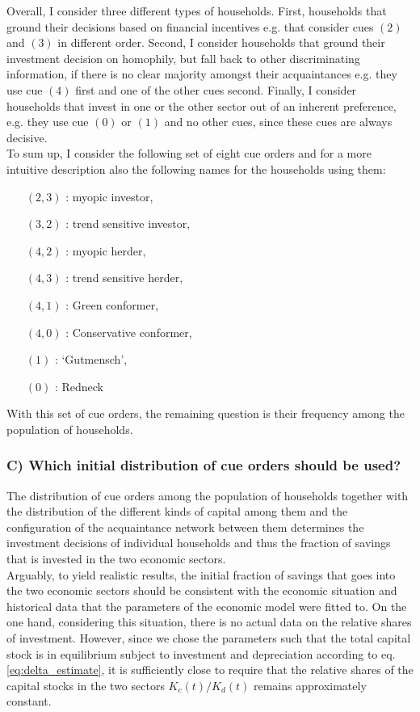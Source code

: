 Overall, I consider three different types of households. First, households that ground their decisions based on financial incentives e.g. that consider cues $(2)$ and $(3)$ in different order. Second, I consider households that ground their investment decision on homophily, but fall back to other discriminating information, if there is no clear majority amongst their acquaintances e.g. they use cue $(4)$ first and one of the other cues second. Finally, I consider households that invest in one or the other sector out of an inherent preference, e.g. they use cue $(0)$ or $(1)$ and no other cues, since these cues are always decisive. \\

To sum up, I consider the following set of eight cue orders and for a more intuitive description also the following names for the households using them:
\begin{itemize}
  \item [$(2, 3)$]: myopic investor,
	\item [$(3, 2)$]: trend sensitive investor,
	\item [$(4, 2)$]: myopic herder,
	\item [$(4, 3)$]: trend sensitive herder,
	\item [$(4, 1)$]: Green conformer,
	\item [$(4, 0)$]: Conservative conformer,
	\item [$(1)$]: `Gutmensch',
	\item [$(0)$]: Redneck
\end{itemize}
With this set of cue orders, the remaining question is their frequency among the population of households.

\subsubsection*{C) Which initial distribution of cue orders should be used?}

The distribution of cue orders among the population of households together with the distribution of the different kinds of capital among them and the configuration of the acquaintance network between them determines the investment decisions of individual households and thus the fraction of savings that is invested in the two economic sectors. \\
Arguably, to yield realistic results, the initial fraction of savings that goes into the two economic sectors should be consistent with the economic situation and historical data that the parameters of the economic model were fitted to. On the one hand, considering this situation, there is no actual data on the relative shares of investment. However, since we chose the parameters such that the total capital stock is in equilibrium subject to investment and depreciation according to eq. \ref{eq:delta_estimate}, it is sufficiently close to require that the relative shares of the capital stocks in the two sectors $K_c(t)/K_d(t)$ remains approximately constant.\\


